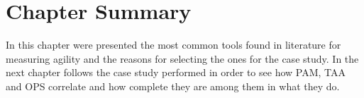 \section{Chapter Summary}
In this chapter were presented the most common tools found in literature for measuring agility and the reasons for selecting the ones for the case study. In the next chapter follows the case study performed in order to see how \ac{PAM}, \ac{TAA} and \ac{OPS} correlate and how complete they are among them in what they do.
